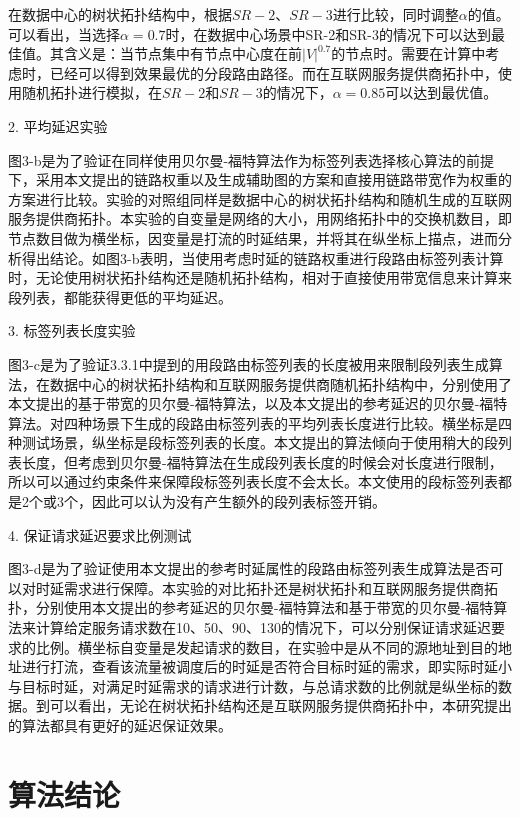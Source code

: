 在数据中心的树状拓扑结构中，根据$SR-2$、$SR-3$进行比较，同时调整$\alpha$的值。可以看出，当选择$\alpha=0.7$时，在数据中心场景中SR-2和SR-3的情况下可以达到最佳值。其含义是：当节点集中有节点中心度在前${|V|}^{0.7}$的节点时。需要在计算中考虑时，已经可以得到效果最优的分段路由路径。而在互联网服务提供商拓扑中，使用随机拓扑进行模拟，在$SR-2$和$SR-3$的情况下，$\alpha=0.85$可以达到最优值。

2. 平均延迟实验

图3-b是为了验证在同样使用贝尔曼-福特算法作为标签列表选择核心算法的前提下，采用本文提出的链路权重以及生成辅助图的方案和直接用链路带宽作为权重的方案进行比较。实验的对照组同样是数据中心的树状拓扑结构和随机生成的互联网服务提供商拓扑。本实验的自变量是网络的大小，用网络拓扑中的交换机数目，即节点数目做为横坐标，因变量是打流的时延结果，并将其在纵坐标上描点，进而分析得出结论。如图3-b表明，当使用考虑时延的链路权重进行段路由标签列表计算时，无论使用树状拓扑结构还是随机拓扑结构，相对于直接使用带宽信息来计算来段列表，都能获得更低的平均延迟。

3. 标签列表长度实验

图3-c是为了验证3.3.1中提到的用段路由标签列表的长度被用来限制段列表生成算法，在数据中心的树状拓扑结构和互联网服务提供商随机拓扑结构中，分别使用了本文提出的基于带宽的贝尔曼-福特算法，以及本文提出的参考延迟的贝尔曼-福特算法。对四种场景下生成的段路由标签列表的平均列表长度进行比较。横坐标是四种测试场景，纵坐标是段标签列表的长度。本文提出的算法倾向于使用稍大的段列表长度，但考虑到贝尔曼-福特算法在生成段列表长度的时候会对长度进行限制，所以可以通过约束条件来保障段标签列表长度不会太长。本文使用的段标签列表都是2个或3个，因此可以认为没有产生额外的段列表标签开销。

4. 保证请求延迟要求比例测试

图3-d是为了验证使用本文提出的参考时延属性的段路由标签列表生成算法是否可以对时延需求进行保障。本实验的对比拓扑还是树状拓扑和互联网服务提供商拓扑，分别使用本文提出的参考延迟的贝尔曼-福特算法和基于带宽的贝尔曼-福特算法来计算给定服务请求数在10、50、90、130的情况下，可以分别保证请求延迟要求的比例。横坐标自变量是发起请求的数目，在实验中是从不同的源地址到目的地址进行打流，查看该流量被调度后的时延是否符合目标时延的需求，即实际时延小与目标时延，对满足时延需求的请求进行计数，与总请求数的比例就是纵坐标的数据。到可以看出，无论在树状拓扑结构还是互联网服务提供商拓扑中，本研究提出的算法都具有更好的延迟保证效果。

\section{算法结论}

